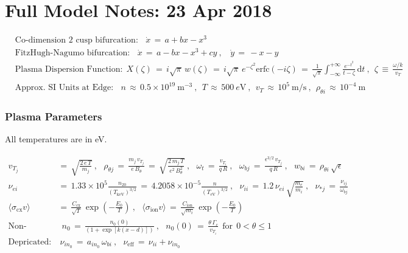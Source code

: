\documentclass[a4paper,8pt]{article}
\date{}
\begin{document}
\section{Full Model Notes: 23 Apr
2018}\label{full-model-notes-23-apr-2018}

\small

\begin{align}
    &\text{Co-dimension 2 cusp bifurcation:} ~~~~ \dot{x} \,=\, a + bx - x^3 \\
    &\text{FitzHugh-Nagumo bifurcation:} ~~~~ \dot{x} \,=\, a - bx - x^3 + cy~,
        ~~~~ \dot{y} \,=\, -x - y \\
    &\text{Plasma Dispersion Function:} ~~ X(\zeta) \,=\, i \sqrt{\pi}\,w(\zeta)
        \,=\, i \sqrt{\pi} \, e^{-\zeta^2} \text{erfc}(-i \zeta)
        \,=\, \frac{1}{\sqrt{\pi}} \int_{-\infty}^{+\infty}
        \frac{e^{-t^2}}{t - \zeta} \, \text{d}t~,~~
        \zeta \,\equiv\, \frac{\omega/k}{v_T} \\
    &\text{Approx. SI Units at Edge:} ~~~~ n \,\approx\, 0.5\times 10^{19}~\text{m}^{-3}~,
        ~~ T \,\approx\, 500~e\text{V}~,~~ v_T \,\approx\, 10^5~\text{m}/\text{s}~,
        ~~ \rho_{\theta i} \,\approx\, 10^{-4}~\text{m}
\end{align}

\normalsize

\subsubsection{Plasma Parameters}\label{plasma-parameters}

All temperatures are in eV. \small

\begin{align}
    v_{T_j} \,&=\, \sqrt{\frac{2 \, e \, T}{m_j}}~,~~~
        \rho_{\theta j} \,=\, \frac{m_j \, v_{T_j}}{e \, B_\theta} \,=\,
            \sqrt{\frac{2 \, m_j \, T}{e^2 \, B_\theta^2}}~,~~~
        \omega_t \,=\, \frac{v_{T_i}}{q\,R}~,~~~
        \omega_{bj} \,=\, \frac{\epsilon^{3/2} \, v_{T_j}}{q \, R}~,~~~
        w_{bi} \,=\, \rho_{\theta i} \, \sqrt{\epsilon} \\
    \nu_{ei} \,&=\, 1.33\times 10^5 \frac{n_{20}}{(T_\text{keV})^{3/2}}
        \,=\, 4.2058\times 10^{-5} \frac{n}{(T_\text{eV})^{3/2}}~,~~~
        \nu_{ii} \,=\, 1.2\, \nu_{ei} \, \sqrt{\frac{m_e}{m_i}}~,~~~
        \nu_{*j} \,=\, \frac{\nu_{ij}}{\omega_{bj}} \\
    \langle \sigma_\text{cx} v \rangle \,&=\, \frac{C_\text{cx}}{\sqrt{T}} \,
        \exp\left(-\frac{E_0}{T}\right)~,~~~
        \langle \sigma_\text{ion} v \rangle \,=\, \frac{C_\text{ion}}{\sqrt{m_i}} \,
        \exp\left(-\frac{E_0}{T}\right) \\
    \text{Non-formal:}& ~~ n_0 \,=\, \frac{n_0(0)}
        {\left(1 + \exp\left[k(x - d)\right]\right)}~,~~~
        n_0(0) \,=\, \frac{\theta \, \Gamma_c}{v_{T_i}} ~~ \text{for} ~~
        0 < \theta \leq 1 \\
    \text{Depricated:}&~\nu_{in_0} \,=\, a_{in_0} \, \omega_{bi}~,~~~
        \nu_\text{eff} \,=\, \nu_{ii} + \nu_{in_0}
\end{align}
\end{document}
